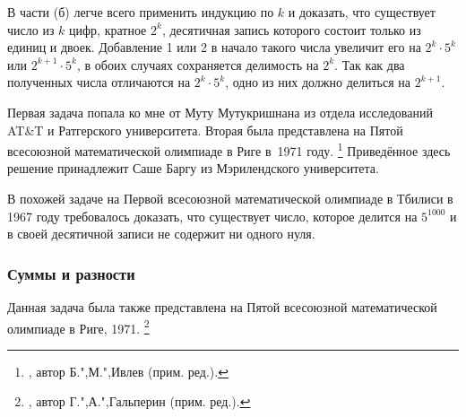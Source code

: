\documentclass[twoside]{book}
\begin{document}
\medskip

В части (б) легче всего применить индукцию по $k$
и доказать, что существует число из $k$ цифр, кратное $2^k$, десятичная запись которого состоит только из единиц и двоек.
Добавление 1 или 2 в начало такого числа увеличит его на $2^k\cdot 5^k$ или $2^{k+1}\cdot 5^k$, в обоих случаях сохраняется делимость на $2^k$.
Так как два полученных числа отличаются на $2^k\cdot 5^k$, одно из них должно делиться на $2^{k+1}$.
\heart

Первая задача попала ко мне от Муту Мутукришнана %
из отдела исследований AT\&T и Ратгерского университета.
Вторая была представлена на Пятой всесоюзной математической олимпиаде в Риге в~1971 году.%
\footnote{\cite[№144]{ВсМО}, автор  Б.",М.",Ивлев (прим. ред.).}
Приведённое здесь решение принадлежит Саше Баргу %
из Мэрилендского университета.

\medskip

В похожей задаче на Первой всесоюзной математической олимпиаде в Тбилиси в 1967 году требовалось доказать, что существует число, которое делится на $5^{1000}$ и в своей десятичной записи не содержит ни одного нуля.
\heart

\subsubsection*{Суммы и разности}%

Данная задача была также представлена на Пятой всесоюзной математической олимпиаде в Риге, 1971.%
\footnote{\cite[№153]{ВсМО}, автор  Г.",А.",Гальперин (прим. ред.).}

\medskip

\end{document}
